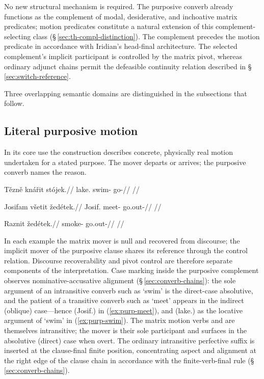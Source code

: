 \begin{center}
\end{center}

\noindent No new structural mechanism is required. The purposive converb already
functions as the complement of modal, desiderative, and inchoative matrix
predicates; motion predicates constitute a natural extension of this
complement-selecting class (§\,\ref{sec:th-compl-distinction}). The
complement precedes the motion predicate in accordance with Iridian's
head-final architecture. The selected complement's implicit participant is
controlled by the matrix pivot, whereas ordinary adjunct chains permit the
defeasible continuity relation described in §\,\ref{sec:switch-reference}.

Three overlapping semantic domains are distinguished in the subsections that
follow.

\subsection{Literal purposive motion}\label{sec:purp-motion-literal}

In its core use the construction describes concrete, physically real motion
undertaken for a stated purpose. The mover departs or arrives; the purposive
converb names the reason.

\ex\label{ex:purp-swim}%
\begingl
\gla Tězně knářit stójek.//
\glb lake.\Ind{} swim-\Purp{} go-\Pf{}//
\glft {}//
\endgl
\xe

\ex\label{ex:purp-meet}%
\begingl
\gla Josifam všetit žedétek.//
\glb Josif.\Ind{} meet-\Purp{} go.out-\Pf{}//
\glft {}//
\endgl
\xe

\ex\label{ex:purp-smoke}%
\begingl
\gla Raznit žedétek.//
\glb smoke-\Purp{} go.out-\Pf{}//
\glft {}//
\endgl
\xe

In each example the matrix mover is null and recovered from discourse;
the implicit mover of the purposive clause shares its reference through
the control relation. Discourse recoverability and pivot control are
therefore separate components of the interpretation. Case marking inside the purposive
complement observes nominative-accusative alignment
(§\,\ref{sec:converb-chains}): the sole argument of an intransitive converb such
as  `swim' is the direct-case absolutive, and the patient of a
transitive converb such as  `meet' appears in the indirect (oblique)
case---hence  (Josif.\Ind{}) in (\ref{ex:purp-meet}), and
 (lake.\Ind{}) as the locative argument of `swim' in
(\ref{ex:purp-swim}). The matrix motion verbs  and  are
themselves intransitive; the mover is their sole participant and surfaces in the
absolutive (direct) case when overt. The ordinary intransitive perfective suffix  is
inserted at the clause-final finite position, concentrating aspect and alignment
at the right edge of the clause chain in accordance with the finite-verb-final
rule (§\,\ref{sec:converb-chains}).

